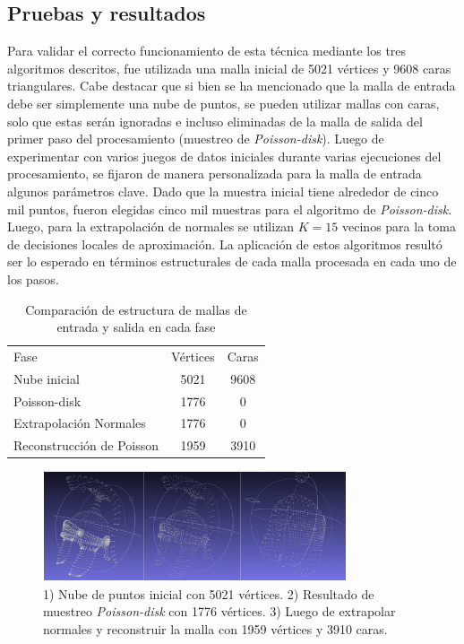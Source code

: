 \subsection{Pruebas y resultados}


Para validar el correcto funcionamiento de esta técnica mediante los tres algoritmos descritos, fue utilizada una malla inicial de 5021 vértices y 9608 caras triangulares. Cabe destacar que si bien se ha mencionado que la malla de entrada debe ser simplemente una nube de puntos, se pueden utilizar mallas con caras, solo que estas serán ignoradas e incluso eliminadas de la malla de salida del primer paso del procesamiento (muestreo de \emph{Poisson-disk}).
Luego de experimentar con varios juegos de datos iniciales durante varias ejecuciones del procesamiento, se fijaron de manera personalizada para la malla de entrada algunos parámetros clave. Dado que la muestra inicial tiene alrededor de cinco mil puntos, fueron elegidas cinco mil muestras para el algoritmo de \emph{Poisson-disk}. Luego, para la extrapolación de normales se utilizan $K=15$ vecinos para la toma de decisiones locales de aproximación.
La aplicación de estos algoritmos resultó ser lo esperado en términos estructurales de cada malla procesada en cada uno de los pasos.

\begin{table}
\begin{center}
\begin{tabular}{|l||cc|} \hline
	Fase & Vértices & Caras \\
	Nube inicial & 5021 & 9608 \\
	Poisson-disk & 1776 & 0 \\
	Extrapolación Normales & 1776 & 0 \\
	Reconstrucción de Poisson & 1959 & 3910 \\ \hline %
\end{tabular}
\caption{Comparación de estructura de mallas de entrada y salida en cada fase}
\end{center}
\end{table}

\begin{figure}[H]
  \centering
    \includegraphics[width=0.8\textwidth]{./Cap6_reconstruccion/malla-nubepuntos.png}
  \caption{1) Nube de puntos inicial con 5021 vértices. 2) Resultado de muestreo \emph{Poisson-disk} con 1776 vértices. 3) Luego de extrapolar normales y reconstruir la malla con 1959 vértices y 3910 caras.}
  \label{fig:Mesh-Results}
\end{figure}
 
